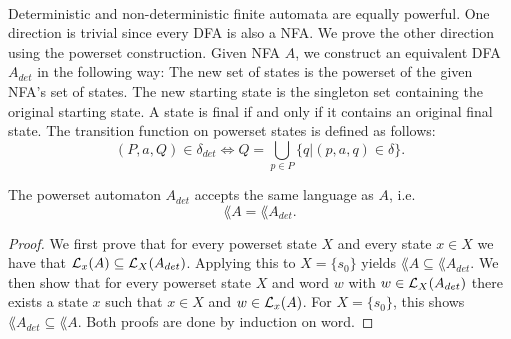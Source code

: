 \documentclass[11pt,a4paper,oneside]{book}
\begin{document}
                    \paragraph{} 
                        Deterministic and non-deterministic finite automata are equally powerful. 
                        One direction is trivial since every DFA is also a NFA. 
                        We prove the other direction using the powerset construction. 
                        Given NFA $A$, we construct an equivalent DFA $A_{det}$ in the following way:
                        The new set of states is the powerset of the given NFA's set of states. 
                        The new starting state is the singleton set containing the original starting state. 
                        A state is final if and only if it contains an original final state. 
                        The transition function on powerset states is defined as follows:
                        \[
                            (P, a, Q) \in \delta_{det} \Longleftrightarrow Q = \bigcup \limits _{p \in P} \{ q | (p,a,q) \in \delta \}.
                        \]


                    \vspace{-0.4cm}
                    \vspace{-0.4cm}

                    \begin{theorem}
                        The powerset automaton $A_{det}$ accepts the same language as $A$, i.e.
                        \[
                            \lang{A} = \lang{A_{det}}.
                        \]
                    \end{theorem}

                    \begin{proof}
                        We first prove that for every powerset state $X$ and every state $x \in X$ we have that $\mathcal{L}_x(A) \subseteq \mathcal{L}_X(A_{det})$. 
                        Applying this to $X=\{s_0\}$ yields $\lang{A} \subseteq \lang{A_{det}}$.
                        We then show that for every powerset state $X$ and word $w$ with $w \in \mathcal{L}_X(A_{det})$ there exists a state $x$ such that $x \in X$ and $w \in \mathcal{L}_x(A)$. 
                        For $X = \{s_0\}$, this shows $\lang{A_{det}} \subseteq \lang{A}$.
                        Both proofs are done by induction on word.
                    \end{proof}
\end{document}
